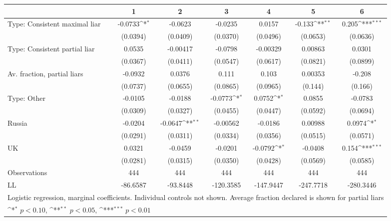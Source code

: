 {
\def\sym#1{\ifmmode^{#1}\else\(^{#1}\)\fi}
\begin{tabular}{l*{6}{c}}
\hline\hline
                &\multicolumn{1}{c}{1}&\multicolumn{1}{c}{2}&\multicolumn{1}{c}{3}&\multicolumn{1}{c}{4}&\multicolumn{1}{c}{5}&\multicolumn{1}{c}{6}\\
\hline
Type: Consistent maximal liar&  -0.0733\sym{*}  &  -0.0623         &  -0.0235         &   0.0157         &   -0.133\sym{**} &    0.205\sym{***}\\
                & (0.0394)         & (0.0409)         & (0.0370)         & (0.0496)         & (0.0653)         & (0.0636)         \\
Type: Consistent partial liar&   0.0535         & -0.00417         &  -0.0798         & -0.00329         &  0.00863         &   0.0301         \\
                & (0.0367)         & (0.0411)         & (0.0547)         & (0.0617)         & (0.0821)         & (0.0899)         \\
Av. fraction, partial liars&  -0.0932         &   0.0376         &    0.111         &    0.103         &  0.00353         &   -0.208         \\
                & (0.0737)         & (0.0655)         & (0.0865)         & (0.0965)         &  (0.144)         &  (0.166)         \\
Type: Other     &  -0.0105         &  -0.0188         &  -0.0773\sym{*}  &   0.0752\sym{*}  &   0.0855         &  -0.0783         \\
                & (0.0309)         & (0.0327)         & (0.0455)         & (0.0447)         & (0.0592)         & (0.0694)         \\
Russia          &  -0.0204         &  -0.0647\sym{**} & -0.00562         &  -0.0186         &  0.00988         &   0.0974\sym{*}  \\
                & (0.0291)         & (0.0311)         & (0.0334)         & (0.0356)         & (0.0515)         & (0.0571)         \\
UK              &   0.0321         &  -0.0459         &  -0.0201         &  -0.0792\sym{*}  &  -0.0408         &    0.154\sym{***}\\
                & (0.0281)         & (0.0315)         & (0.0350)         & (0.0428)         & (0.0569)         & (0.0585)         \\
\hline
Observations    &      444         &      444         &      444         &      444         &      444         &      444         \\
LL               &  -86.6587      &    -93.8448        &      -120.3585   &    -147.9447     &    -247.7718     &     -280.3446    \\
\hline\hline
\multicolumn{7}{l}{\footnotesize Logistic regression, marginal coefficients. Individual controls not shown. Average fraction declared is shown for partial liars}\\
\multicolumn{7}{l}{\footnotesize \sym{*} \(p<0.10\), \sym{**} \(p<0.05\), \sym{***} \(p<0.01\)}\\
\end{tabular}
}
